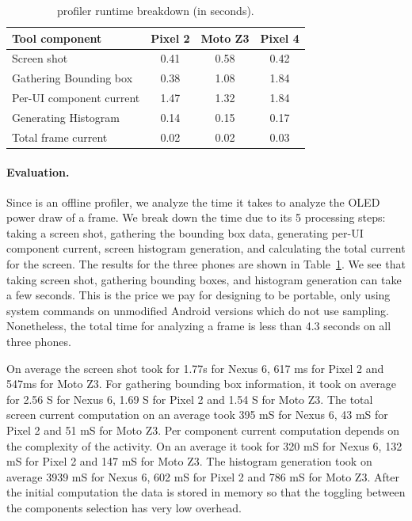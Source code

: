 \begin{table}[tp]
\begin{center}
	\centering
	\caption{\name profiler runtime breakdown (in seconds).}
	\label{tab:tooloverhead}
        \vspace{-0.1in}
    {\footnotesize
                \begin{tabular*}{\columnwidth}{ | l | c | c | c | }
		\hline
		Tool component        	&  Pixel 2 & Moto Z3 & Pixel 4\\
		\hline
		Screen shot	        	&  0.41 & 0.58 & 0.42 \\
		Gathering Bounding box  &  0.38 & 1.08 & 1.84 \\
		Per-UI component current	&  1.47 & 1.32 & 1.84 \\
		Generating Histogram	&  0.14 & 0.15 & 0.17 \\  
		Total frame current     &  0.02 & 0.02 & 0.03 \\
		\hline
	\end{tabular*}
	}
\end{center}
\vspace{-0.15in}
\end{table}

\paragraph{Evaluation.}
Since \name is an offline profiler,
we analyze the time it takes to analyze the OLED power draw of a frame.
We break down the time due
to its 5 processing steps: taking a screen shot, gathering the bounding box
data, generating per-UI component current, screen histogram generation,
and calculating the total current for the screen.  The results for the
three phones are shown in Table~\ref{tab:tooloverhead}.  We see that
taking screen shot, gathering bounding boxes, and histogram generation can
take a few seconds. This is the price we pay
for designing \name to be portable, \ie  only using system
commands on unmodified Android versions which do not use sampling.
Nonetheless, the total time for analyzing a frame is less than 4.3
seconds on all three phones.



On average the screen shot took for 1.77s for Nexus 6, 617
ms for Pixel 2 and 547ms for Moto Z3.  For gathering bounding box
information, it took on average for 2.56 S for Nexus 6, 1.69 S for
Pixel 2 and 1.54 S for Moto Z3.  The total screen current computation
on an average took 395 mS for Nexus 6, 43 mS for Pixel 2 and 51 mS for
Moto Z3.  Per component current computation depends on the complexity
of the activity. On an average it took for 320 mS for Nexus 6, 132 mS
for Pixel 2 and 147 mS for Moto Z3.  The histogram generation took on
average 3939 mS for Nexus 6, 602 mS for Pixel 2 and 786 mS for Moto
Z3.  After the initial computation the data is stored in memory so
that the toggling between the components selection has very low
overhead.
\fi

